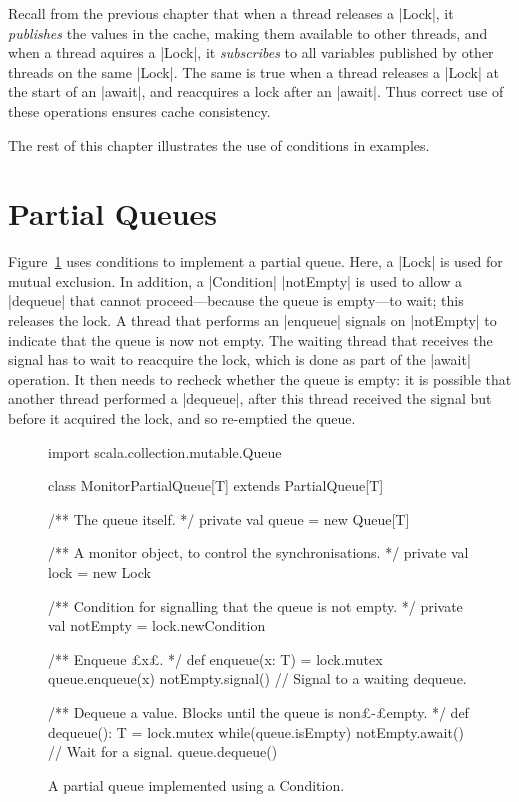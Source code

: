 Recall from the previous chapter that when a thread releases a |Lock|,
it \emph{publishes} the values in the cache, making them
available to other threads, and when a thread aquires a |Lock|, it
\emph{subscribes} to all variables published by other threads
on the same |Lock|.  The same is true when a thread releases a |Lock| at the
start of an |await|, and reacquires a lock after an |await|.  Thus correct use
of these operations ensures cache consistency. 

The rest of this chapter illustrates the use of conditions in
examples. 


\section{Partial Queues}

Figure~\ref{fig:MonitorPartialQueue} uses conditions to implement a
partial queue.  %
Here, a |Lock| is used for
mutual exclusion.  In addition, a |Condition| |notEmpty| is used to allow a
|dequeue| that cannot proceed---because the queue is empty---to wait; this
releases the lock.  A thread that performs an |enqueue| signals on |notEmpty|
to indicate that the queue is now not empty.  The waiting thread that receives
the signal  has to wait to reacquire the lock, which is done as part of
the |await| operation.  It then needs to recheck whether the queue is empty:
it is possible that another thread performed a |dequeue|, after this thread
received the signal but before it acquired the lock, and so re-emptied the
queue.


\begin{figure}[bph]
\begin{scala}
import scala.collection.mutable.Queue

class MonitorPartialQueue[T] extends PartialQueue[T]{
  /** The queue itself. */
  private val queue = new Queue[T]

  /** A monitor object, to control the synchronisations. */
  private val lock = new Lock

  /** Condition for signalling that the queue is not empty. */
  private val notEmpty = lock.newCondition

  /** Enqueue £x£. */
  def enqueue(x: T) = lock.mutex{
    queue.enqueue(x)
    notEmpty.signal() // Signal to a waiting dequeue.
  } 

  /** Dequeue a value.  Blocks until the queue is non£-£empty. */
  def dequeue(): T = lock.mutex{
    while(queue.isEmpty) notEmpty.await() // Wait for a signal.
    queue.dequeue()
  }
}
\end{scala}
\caption{A partial queue implemented using a {\scalastyle Condition}.}
\label{fig:MonitorPartialQueue}
\end{figure}

